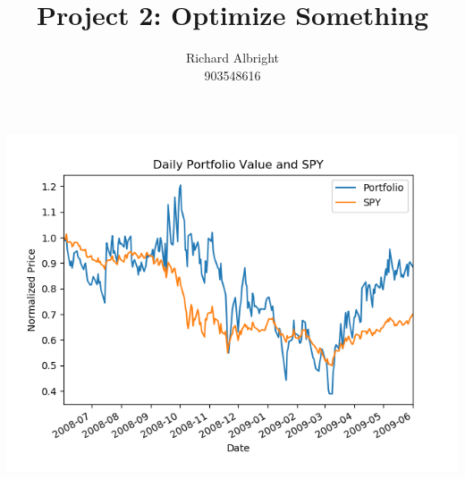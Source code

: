 \documentclass[
	letterpaper, %
]{jdf}
\author{
	Richard Albright \\
	903548616}
\title{Project 2: Optimize Something}
\begin{document}

\maketitle

\includegraphics[width=14cm]{figure1.png} \\
	
\end{document}
